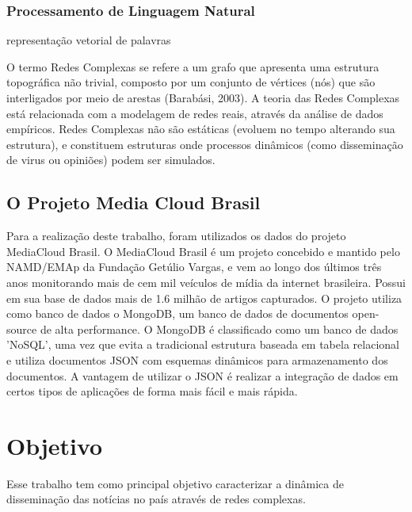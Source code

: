 \documentclass[a4paper,12pt]{article}
\begin{document}
\subsubsection{Processamento de Linguagem Natural}
\label{sec:nlp}
representação vetorial de palavras

O termo Redes Complexas se refere a um grafo que apresenta uma estrutura topográfica não trivial, composto por um conjunto
 de vértices (nós) que são interligados por meio de arestas (Barabási, 2003). A teoria das Redes Complexas  está relacionada com a modelagem de redes reais, através da 
 análise de dados empíricos. Redes Complexas não são estáticas (evoluem no tempo alterando sua estrutura), e 
 constituem estruturas onde processos dinâmicos (como disseminação de virus ou opiniões) podem ser simulados.
 
\subsection{O Projeto Media Cloud Brasil}

Para a realização deste trabalho, foram utilizados os dados do projeto MediaCloud Brasil. O MediaCloud Brasil é um projeto concebido e mantido pelo
NAMD/EMAp da Fundação Getúlio Vargas, e vem ao longo dos últimos três anos monitorando mais de cem mil veículos de mídia da internet brasileira. Possui em
sua base de dados mais de 1.6 milhão de artigos capturados.
O projeto utiliza como banco de dados o MongoDB, um banco de dados de documentos open-source de alta performance. O MongoDB é classificado como um banco de 
dados 'NoSQL', uma vez que evita a tradicional estrutura  baseada em tabela relacional e utiliza documentos JSON com esquemas dinâmicos para armazenamento 
dos documentos. A vantagem de utilizar o JSON é realizar a integração de dados em certos tipos de aplicações de forma mais fácil e mais rápida.
\section{Objetivo}

Esse trabalho tem como principal objetivo caracterizar a dinâmica de disseminação das notícias no país através de redes complexas.
\end{document}
